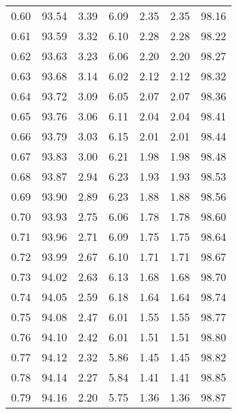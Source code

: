 \begin{tabular}{|c|c|c|c|c|c|c|}
      0.60 &     93.54 &      3.39 &       6.09 &    2.35 &       2.35 &         98.16 \\
      0.61 &     93.59 &      3.32 &       6.10 &    2.28 &       2.28 &         98.22 \\
      0.62 &     93.63 &      3.23 &       6.06 &    2.20 &       2.20 &         98.27 \\
      0.63 &     93.68 &      3.14 &       6.02 &    2.12 &       2.12 &         98.32 \\
      0.64 &     93.72 &      3.09 &       6.05 &    2.07 &       2.07 &         98.36 \\
      0.65 &     93.76 &      3.06 &       6.11 &    2.04 &       2.04 &         98.41 \\
      0.66 &     93.79 &      3.03 &       6.15 &    2.01 &       2.01 &         98.44 \\
      0.67 &     93.83 &      3.00 &       6.21 &    1.98 &       1.98 &         98.48 \\
      0.68 &     93.87 &      2.94 &       6.23 &    1.93 &       1.93 &         98.53 \\
      0.69 &     93.90 &      2.89 &       6.23 &    1.88 &       1.88 &         98.56 \\
      0.70 &     93.93 &      2.75 &       6.06 &    1.78 &       1.78 &         98.60 \\
      0.71 &     93.96 &      2.71 &       6.09 &    1.75 &       1.75 &         98.64 \\
      0.72 &     93.99 &      2.67 &       6.10 &    1.71 &       1.71 &         98.67 \\
      0.73 &     94.02 &      2.63 &       6.13 &    1.68 &       1.68 &         98.70 \\
      0.74 &     94.05 &      2.59 &       6.18 &    1.64 &       1.64 &         98.74 \\
      0.75 &     94.08 &      2.47 &       6.01 &    1.55 &       1.55 &         98.77 \\
      0.76 &     94.10 &      2.42 &       6.01 &    1.51 &       1.51 &         98.80 \\
      0.77 &     94.12 &      2.32 &       5.86 &    1.45 &       1.45 &         98.82 \\
      0.78 &     94.14 &      2.27 &       5.84 &    1.41 &       1.41 &         98.85 \\
      0.79 &     94.16 &      2.20 &       5.75 &    1.36 &       1.36 &         98.87 \\

\end{tabular}
